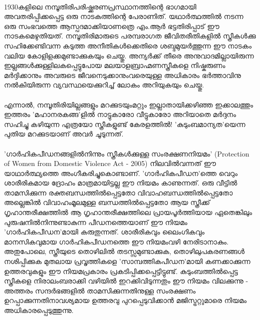 \label{ch2box2} %
\begin{tcolorbox}[%
  breakable, %
  arc=0mm, 
  left=1pt, right = 1pt, 
  boxrule=0mm,
  colback = {blue!10}, %
] 

\paragraph{}1930കളിലെ നമ്പൂതിരിപരിഷ്ക്കരണപ്രസ്ഥാനത്തിന്റെ ഭാഗമായി അവതരിപ്പിക്കപ്പെട്ട ഒരു നാടകത്തിന്റെ പേരാണിത്. യഥാർത്ഥത്തിൽ നടന്ന ഒരു സംഭവത്തെ ആസ്പദമാക്കിയാണത്രെ എം.ആർ ഭട്ടതിരിപ്പാട് ഈ നാടകമെഴുതിയത്. നമ്പൂതിരിമാരുടെ പരമ്പരാഗത ജീവിതരീതികളിൽ സ്ത്രീകൾക്കു സഹിക്കേണ്ടിവന്ന കടുത്ത അനീതികൾക്കെതിരെ ശബ്ദമുയർത്തുന്ന ഈ നാടകം വലിയ കോളിളക്കമുണ്ടാക്കുകയും ചെയ്തു. അന്യർക്ക് തീരെ അനുവാദമില്ലായിരുന്ന ഇല്ലങ്ങൾക്കുള്ളിലകപ്പെട്ടുപോയ മലയാളബ്രാഹ്മണസ്ത്രീകളെ നിഷ്കരുണം മർദ്ദിക്കാനും അവരുടെ ജീവനെടുക്കാനുംവരെയുള്ള അധികാരം ഭർത്താവിനു നൽകിയിരുന്ന വ്യവസ്ഥയെക്കുറിച്ച് ലോകം അറിയുകയും ചെയ്തു.
\paragraph{}എന്നാൽ, നമ്പൂതിരിയില്ലങ്ങളും മറക്കുടയുംമറ്റും ഇല്ലാതായിക്കഴിഞ്ഞ ഇക്കാലത്തും ഇത്തരം 'മഹാനരകങ്ങ'ളിൽ നാട്ടുകാരോ വീട്ടുകാരോ അറിയാതെ മർദ്ദനം സഹിച്ചു കഴിയുന്ന എത്രയോ സ്ത്രീകളുണ്ട് കേരളത്തിൽ! 'കുടുംബമാന്യത'യെന്ന പുതിയ മറക്കുടയാണ് അവർ ചൂടുന്നത്.
\paragraph{}'ഗാർഹികപീഡനങ്ങളിൽനിന്നും സ്ത്രീകൾക്കുള്ള സംരക്ഷണനിയമം' (Protection of Women from Domestic Violence Act - 2005) നിലവിൽവന്നത് ഈ യാഥാർത്ഥ്യത്തെ അംഗീകരിച്ചുകൊണ്ടാണ്. 'ഗാർഹികപീഡന'ത്തെ വെറും ശാരീരികമായ ദ്രോഹം മാത്രമായിട്ടല്ല ഈ നിയമം കാണുന്നത്. ഒരു വീട്ടിൽ താമസിക്കുന്ന രക്തബന്ധത്തിൽപ്പെട്ടതോ വിവാഹബന്ധത്തിൽപ്പെട്ടതോ അല്ലെങ്കിൽ വിവാഹംമൂലമുള്ള ബന്ധത്തിൽപ്പെട്ടതോ ആയ സ്ത്രീക്ക് ഗൃഹാന്തരീക്ഷത്തിൽ ആ ഗൃഹാന്തരീക്ഷത്തിലെ പ്രായപൂർത്തിയായ ഏതെങ്കിലും പുരുഷനിൽനിന്നുണ്ടാകുന്ന പീഡനത്തെയാണ് ഈ നിയമം 'ഗാർഹികപീഡന'മായി കരുതുന്നത്. ശാരീരികവും ലൈംഗികവും മാനസികവുമായ ഗാർഹികപീഡനത്തെ ഈ നിയമംവഴി നേരിടാനാകും. അതുപോലെ, സ്ത്രീയുടെ തൊഴിലിൽ തടസ്സമുണ്ടാക്കുക, തൊഴിലുപകരണങ്ങൾ നശിപ്പിക്കുക മുതലായ പ്രവൃത്തികളെ 'സാമ്പത്തികപീഡന'മായി കണക്കാക്കുന്ന ഉത്തരവുകളും ഈ നിയമപ്രകാരം പ്രകടിപ്പിക്കപ്പെട്ടിട്ടുണ്ട്. കുടുംബത്തിൽപ്പെട്ട സ്ത്രീകളെ നിരാലംബരാക്കി വഴിയിൽ ഇറക്കിവിടുന്നതും ഈ നിയമം വിലക്കുന്നു - അത്തരം സന്ദർഭങ്ങളിൽ താമസിക്കുന്നതിനുള്ള സംരക്ഷണം ഉറപ്പാക്കുന്നതിനാവശ്യമായ ഉത്തരവു പുറപ്പെടുവിക്കാൻ മജിസ്ട്രറ്റുമാരെ നിയമം അധികാരപ്പെടുത്തുന്നു.


\end{tcolorbox}

